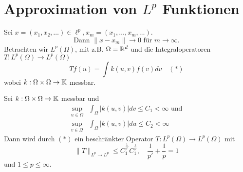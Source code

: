 
\section{Approximation von $L^{p}$ Funktionen}



Sei $x = (x_{1}, x_{2}, \dotsc) \in \ell^{p}, x_{m} = (x_{1}, \dotsc, x_{m}, \dotsc)$. \\
\[ \text{Dann }\|  x - x_{m} \| \rightarrow 0 \text{ für } m \rightarrow \infty. \]
	\newline
Betrachten wir $L^{p}(\Omega)$, mit z.B. $\Omega = \mathbb{R}^{d}$ und die Integraloperatoren $T :	L^{p}(\Omega) \rightarrow L^{p}(\Omega)$
	\[ T f(u) = \int k(u, v) f(v) dv \quad (*) \label{eq:8.0-BeschrOperatorInLp} \]
wobei $k : \Omega \times \Omega \rightarrow \mathbb{K}$ messbar.

\begin{satz} \label{satz:8.1}
	Sei $k : \Omega \times \Omega \rightarrow \mathbb{K}$ messbar	und
	\begin{align*}
		\sup_{u \in \Omega} & \int_{\Omega} |k(u, v)| dv \leq C_{1} < \infty \text{ und} \\
		\sup_{v \in \Omega} & \int_{\Omega} |k(u, v)| du \leq C_{2} < \infty
	\end{align*}
	Dann wird durch \hyperref[eq:8.0-BeschrOperatorInLp]{$(*)$} ein beschränkter Operator $T : L^{p}(\Omega) \rightarrow L^{p}(\Omega)$ mit
	\[ \| T \|_{L^{p} \rightarrow L^{p}} \leq C_{1}^{\frac{1}{p'}} C_{1}^{\frac{1}{p}}, \quad \frac{1}{p'} + \frac{1}{p} = 1   \]
	und $1 \leq p \leq \infty$.
\end{satz}

